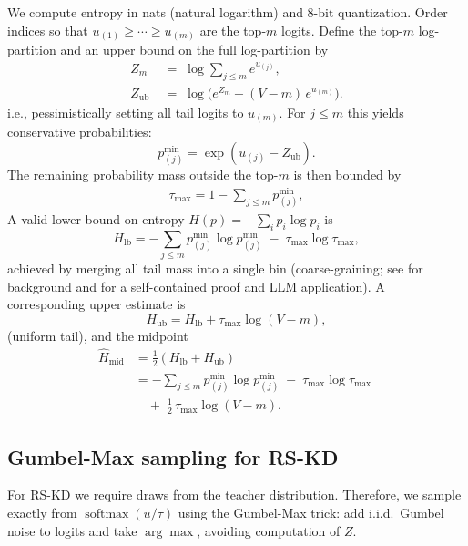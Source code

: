 \documentclass[11pt]{article}
\begin{document}
We compute entropy in nats (natural logarithm) and 8-bit quantization.
Order indices so that $u_{(1)} \geq \cdots \geq u_{(m)}$ are the top-$m$ logits.
Define the top-$m$ log-partition and an upper bound on the full log-partition by
\begin{align*}
	Z_m \;           & =\; \log \sum_{j \leq m} e^{u_{(j)}},           \\
	Z_{\text{ub}} \; & =\; \log\Big(e^{Z_m} + (V-m)\,e^{u_{(m)}}\Big).
\end{align*}
i.e., pessimistically setting all tail logits to $u_{(m)}$. For $j\le m$ this yields conservative probabilities:
\[
	p^{\min}_{(j)}=\exp(u_{(j)}-Z_{\text{ub}}).
\]
The remaining probability mass outside the top-$m$ is then bounded by
\begin{align*}
	\tau_{\max}=1-\sum_{j\le m}p^{\min}_{(j)},
\end{align*}
A valid lower bound on entropy $H(p)=-\sum_i p_i\log p_i$ is
\[
	H_{\text{lb}}=-\sum_{j\le m} p^{\min}_{(j)}\log p^{\min}_{(j)}\;-\;\tau_{\max}\log\tau_{\max},
\]
achieved by merging all tail mass into a single bin (coarse-graining; see \citep{cover2006elements} for background and \citep[\S3.6]{kaltchenko2025entropyheatmap} for a self-contained proof and LLM application). A corresponding upper estimate is
\[
	H_{\text{ub}}=H_{\text{lb}}+\tau_{\max}\log(V-m),
\]
(uniform tail), and the midpoint
\begin{align*}
	\widehat{H}_{\text{mid}} & =\tfrac12\!\left(H_{\text{lb}}+H_{\text{ub}}\right)                                   \\
	                         & = -\sum_{j\le m}p^{\min}_{(j)}\log p^{\min}_{(j)} \;-\; \tau_{\max}\log\tau_{\max} \; \\
	                         & \quad +\; \tfrac12\,\tau_{\max}\log(V-m).
\end{align*}

\subsection{Gumbel-Max sampling for RS-KD}
For RS-KD we require draws from the teacher distribution.
Therefore, we sample exactly from $\operatorname{softmax}(u/\tau)$ using the Gumbel-Max trick: add i.i.d.\ Gumbel noise to logits and take $\arg\max$, avoiding computation of $Z$.
\end{document}
